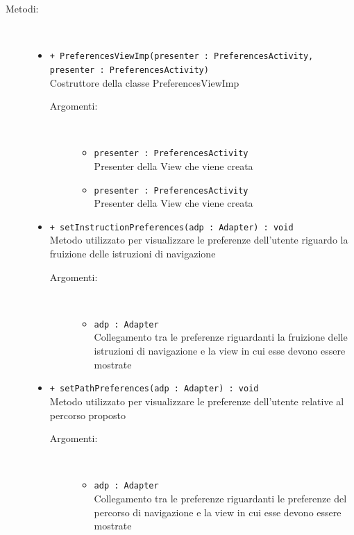 \documentclass[../DefinizioneDiProdotto.tex]{subfiles}
\begin{document}
\begin{description}
\begin{itemize}
\end{itemize}
\item[Metodi:] \
\begin{itemize}
\item \texttt{+ PreferencesViewImp(presenter : PreferencesActivity, presenter : PreferencesActivity)}\\
Costruttore della classe PreferencesViewImp
 \begin{description}
\item[Argomenti:] \
\begin{itemize}
\item \texttt{presenter : PreferencesActivity}\\
Presenter della View che viene creata\item \texttt{presenter : PreferencesActivity}\\
Presenter della View che viene creata\end{itemize}
\end{description}
\item \texttt{+ setInstructionPreferences(adp : Adapter) : void}\\
Metodo utilizzato per visualizzare le preferenze dell'utente riguardo la fruizione delle istruzioni di navigazione
 \begin{description}
\item[Argomenti:] \
\begin{itemize}
\item \texttt{adp : Adapter}\\
Collegamento tra le preferenze riguardanti la fruizione delle istruzioni di navigazione e la view in cui esse devono essere mostrate\end{itemize}
\end{description}
\item \texttt{+ setPathPreferences(adp : Adapter) : void}\\
Metodo utilizzato per visualizzare le preferenze dell'utente relative al percorso proposto
 \begin{description}
\item[Argomenti:] \
\begin{itemize}
\item \texttt{adp : Adapter}\\
Collegamento tra le preferenze riguardanti le preferenze del percorso di navigazione e la view in cui esse devono essere mostrate\end{itemize}
\end{description}
\end{itemize}
\end{description}
\end{document}
